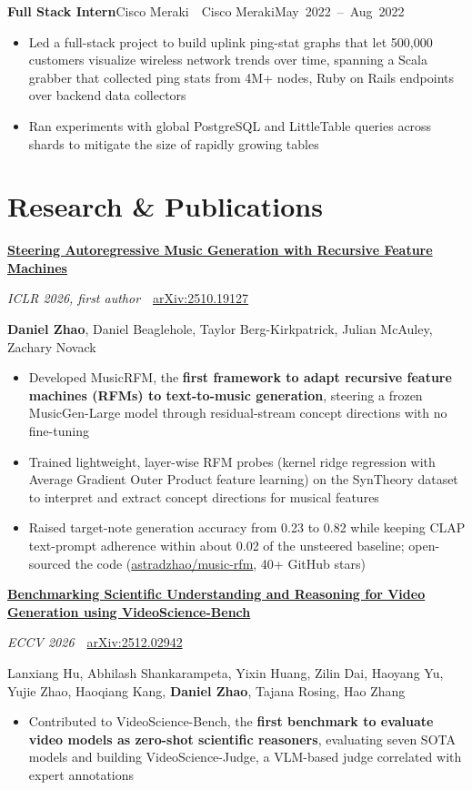 \documentclass[letterpaper,11pt]{article}
\newcommand{\entry}[3]{%
  \needspace{4\baselineskip}%
  \textbf{#1}\ifx\relax#2\relax\else\ \textbar\ #2\fi\hfill\mbox{#3}\par}
\newcommand{\paper}[4]{%
  \needspace{6\baselineskip}%
  \textbf{\href{https://arxiv.org/abs/#2}{#1}}\par
  \textit{#3}\ \textbar\ \href{https://arxiv.org/abs/#2}{arXiv:#2}\par
  {\fontsize{10pt}{13pt}\selectfont #4\par}}
\newenvironment{bullets}
  {\begin{itemize}[leftmargin=1.2em, label=\textbullet, itemsep=1.5pt, parsep=0pt, topsep=2.5pt, partopsep=0pt]}
  {\end{itemize}\vspace{7.7pt}}
\begin{document}
\entry{Full Stack Intern}{Cisco Meraki}{May 2022 -- Aug 2022}
\begin{bullets}
  \item Led a full-stack project to build uplink ping-stat graphs that let 500,000 customers visualize wireless network trends over time, spanning a Scala grabber that collected ping stats from 4M+ nodes, Ruby on Rails endpoints over backend data collectors
  \item Ran experiments with global PostgreSQL and LittleTable queries across shards to mitigate the size of rapidly growing tables
\end{bullets}

\vspace{-10.3pt}
\section{Research \& Publications}

\paper{Steering Autoregressive Music Generation with Recursive Feature Machines}{2510.19127}
  {ICLR 2026, first author}
  {\textbf{Daniel Zhao}, Daniel Beaglehole, Taylor Berg-Kirkpatrick, Julian McAuley, Zachary Novack}
\begin{bullets}
  \item Developed MusicRFM, the \textbf{first framework to adapt recursive feature machines (RFMs) to text-to-music generation}, steering a frozen MusicGen-Large model through residual-stream concept directions with no fine-tuning
  \item Trained lightweight, layer-wise RFM probes (kernel ridge regression with Average Gradient Outer Product feature learning) on the SynTheory dataset to interpret and extract concept directions for musical features
  \item Raised target-note generation accuracy from 0.23 to 0.82 while keeping CLAP text-prompt adherence within about 0.02 of the unsteered baseline; open-sourced the code (\href{https://github.com/astradzhao/music-rfm}{astradzhao/music-rfm}, 40+ GitHub stars)
\end{bullets}

\paper{Benchmarking Scientific Understanding and Reasoning for Video Generation using VideoScience-Bench}{2512.02942}
  {ECCV 2026}
  {\fontsize{9pt}{13pt}\selectfont Lanxiang Hu, Abhilash Shankarampeta, Yixin Huang, Zilin Dai, Haoyang Yu, Yujie Zhao, Haoqiang Kang, \textbf{Daniel Zhao}, Tajana Rosing, Hao Zhang}
\begin{bullets}
  \item Contributed to VideoScience-Bench, the \textbf{first benchmark to evaluate video models as zero-shot scientific reasoners}, evaluating seven SOTA models and building VideoScience-Judge, a VLM-based judge correlated with expert annotations
\end{bullets}
\end{document}

